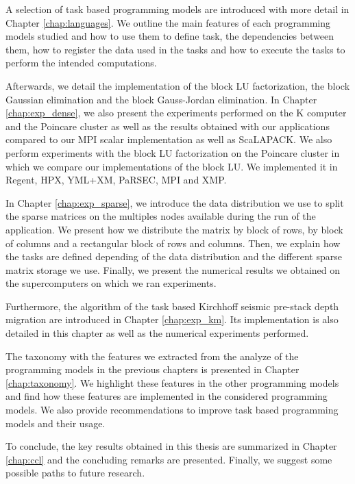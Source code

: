 A selection of task based programming models are introduced with more detail in Chapter \ref{chap:languages}.
We outline the main features of each programming models studied and how to use them to define task, the dependencies between them, how to register the data used in the tasks and how to execute the tasks to perform the intended computations.

Afterwards, we detail the implementation of the block LU factorization, the block Gaussian elimination and the block Gauss-Jordan elimination.
In Chapter \ref{chap:exp_dense}, we also present the experiments performed on the K computer and the Poincare cluster as well as the results obtained with our applications compared to our MPI scalar implementation as well as ScaLAPACK.
We also perform experiments with the block LU factorization on the Poincare cluster in which we compare our implementations of the block LU.
We implemented it in Regent, HPX, YML+XM, PaRSEC, MPI and XMP.

In Chapter \ref{chap:exp_sparse}, we introduce the data distribution we use to split the sparse matrices on the multiples nodes available during the run of the application.
We present how we distribute the matrix by block of rows, by block of columns and a rectangular block of rows and columns.
Then, we explain how the tasks are defined depending of the data distribution and the different sparse matrix storage we use.
Finally, we present the numerical results we obtained on the supercomputers on which we ran experiments.

Furthermore, the algorithm of the task based Kirchhoff seismic pre-stack depth migration are introduced in Chapter \ref{chap:exp_km}.
Its implementation is also detailed in this chapter as well as the numerical experiments performed.

The taxonomy with the features we extracted from the analyze of the programming models in the previous chapters is presented in Chapter \ref{chap:taxonomy}.
We highlight these features in the other programming models and find how these features are implemented in the considered programming models.
We also provide recommendations to improve task based programming models and their usage.

To conclude, the key results obtained in this thesis are summarized in Chapter \ref{chap:ccl} and the concluding remarks are presented.
Finally, we suggest some possible paths to future research.
